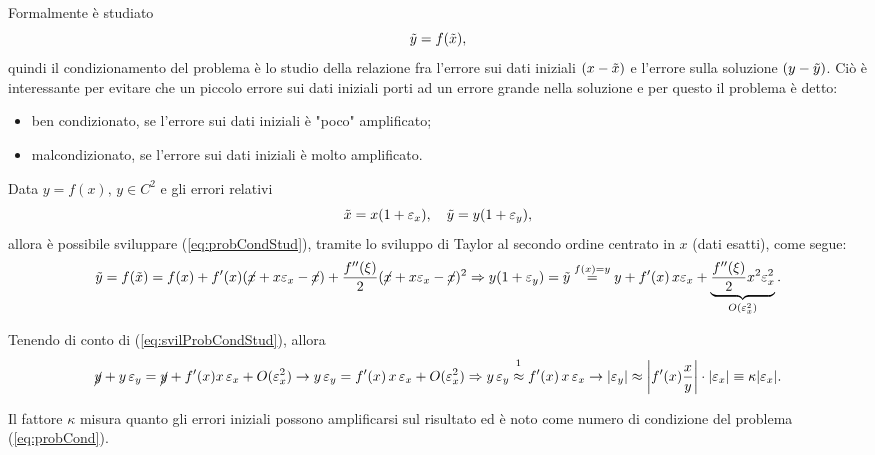 Formalmente è studiato
\begin{equation}\label{eq:probCondStud}
	\Tilde{y}=f(\Tilde{x}),
\end{equation}
quindi il condizionamento del problema è lo studio della relazione fra l'errore sui dati iniziali $(x-\Tilde{x})$ e l'errore sulla soluzione $(y-\Tilde{y})$. Ciò è interessante per evitare che un piccolo errore sui dati iniziali porti ad un errore grande nella soluzione e per questo il problema è detto:
\begin{itemize}
	\item ben condizionato, se l'errore sui dati iniziali è "poco" amplificato;
	\item malcondizionato, se l'errore sui dati iniziali è molto amplificato.
\end{itemize}

Data $y=f(x),\, y\in C^2$ e gli errori relativi \begin{equation*}
	\Tilde{x}=x(1+\varepsilon_x),\quad \Tilde{y}=y(1+\varepsilon_y),
\end{equation*}
allora è possibile sviluppare (\ref{eq:probCondStud}), tramite lo sviluppo di Taylor al secondo ordine centrato in $x$ (dati esatti), come segue:
\begin{equation}\label{eq:svilProbCondStud}
	\Tilde{y}=f(\Tilde{x})=f(x)+f'(x)(\cancel{x}+x\varepsilon_x-\cancel{x})+\frac{f''(\xi)}{2}(\cancel{x}+x\varepsilon_x-\cancel{x})^2\Rightarrow y(1+\varepsilon_y)=\Tilde{y}\overset{f(x)=y}{=}y+f'(x)\, x\varepsilon_x+\underbrace{\frac{f''(\xi)}{2}x^2\varepsilon_x^2}_{O(\varepsilon_x^2)}.
\end{equation}

Tenendo di conto di (\ref{eq:svilProbCondStud}), allora
\begin{equation*}
	\cancel{y}+y\,\varepsilon_y=\cancel{y}+f'(x)x\,\varepsilon_x+O(\varepsilon_x^2)\rightarrow y\,\varepsilon_y=f'(x)\,x\,\varepsilon_x+O(\varepsilon_x^2)\Rightarrow y\,\varepsilon_y \overset{\footnotemark}{\approx}f'(x)\,x\,\varepsilon_x \rightarrow |\varepsilon_y|\approx \left|f'(x)\frac{x}{y}\right|\cdot|\varepsilon_x|\equiv\kappa |\varepsilon_x|.
\end{equation*}


\begin{definition}
	Il fattore $\kappa$ misura quanto gli errori iniziali possono amplificarsi sul risultato ed è noto come numero di condizione del problema (\ref{eq:probCond}).
\end{definition}

